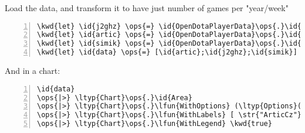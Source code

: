 \documentclass{article}
\newcommand{\id}[1]{\textcolor{black}{#1}}
\newcommand{\kwd}[1]{\textcolor{navy}{#1}}
\newcommand{\ops}[1]{\textcolor{purple}{#1}}
\newcommand{\str}[1]{\textcolor{olive}{#1}}
\begin{document}
Load the data, and transform it to have just number of games per "year/week"
\begin{Verbatim}[commandchars=\\\{\}, numbers=left]
\kwd{let} \id{j2ghz} \ops{=} \id{OpenDotaPlayerData}\ops{.}\id{Load} \str{"https://api.opendota.com/api/players/71050296/matches"} \ops{|>} \lfun{matchesToData}
\kwd{let} \id{artic} \ops{=} \id{OpenDotaPlayerData}\ops{.}\id{Load} \str{"https://api.opendota.com/api/players/101483335/matches"} \ops{|>} \lfun{matchesToData}
\kwd{let} \id{simik} \ops{=} \id{OpenDotaPlayerData}\ops{.}\id{Load} \str{"https://api.opendota.com/api/players/94313396/matches"} \ops{|>} \lfun{matchesToData}
\kwd{let} \id{data} \ops{=} [\id{artic};\id{j2ghz};\id{simik}]
\end{Verbatim}



And in a chart:
\begin{Verbatim}[commandchars=\\\{\}, numbers=left]
\id{data}
\ops{|>} \ltyp{Chart}\ops{.}\id{Area}
\ops{|>} \ltyp{Chart}\ops{.}\lfun{WithOptions} (\ltyp{Options}( \id{isStacked} \ops{=} \kwd{true} ))
\ops{|>} \ltyp{Chart}\ops{.}\lfun{WithLabels} [ \str{"ArticCz"}; \str{"J2ghz"}; \str{"ssimik"}]
\ops{|>} \ltyp{Chart}\ops{.}\lfun{WithLegend} \kwd{true}
\end{Verbatim}
\end{document}

